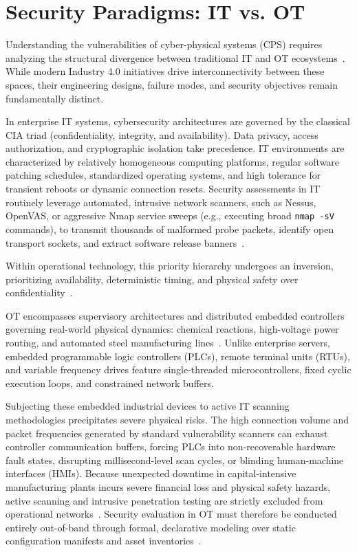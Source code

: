 \documentclass[target=mst,aauheader=aics,style=]{thud}
\begin{document}
\section{Security Paradigms: IT vs. OT}
\label{sec:it_vs_ot}

Understanding the vulnerabilities of cyber-physical systems (CPS) requires analyzing the structural divergence between traditional IT and OT ecosystems~\cite{SunderOT, StanExtended}. While modern Industry 4.0 initiatives drive interconnectivity between these spaces, their engineering designs, failure modes, and security objectives remain fundamentally distinct.

In enterprise IT systems, cybersecurity architectures are governed by the classical CIA triad (confidentiality, integrity, and availability). Data privacy, access authorization, and cryptographic isolation take precedence. IT environments are characterized by relatively homogeneous computing platforms, regular software patching schedules, standardized operating systems, and high tolerance for transient reboots or dynamic connection resets. Security assessments in IT routinely leverage automated, intrusive network scanners, such as Nessus, OpenVAS, or aggressive Nmap service sweeps (e.g., executing broad \texttt{nmap -sV} commands), to transmit thousands of malformed probe packets, identify open transport sockets, and extract software release banners~\cite{Ou05}.

Within operational technology, this priority hierarchy undergoes an inversion, prioritizing availability, deterministic timing, and physical safety over confidentiality~\cite{SunderOT}. 

OT encompasses supervisory architectures and distributed embedded controllers governing real-world physical dynamics: chemical reactions, high-voltage power routing, and automated steel manufacturing lines~\cite{StanExtended}. Unlike enterprise servers, embedded programmable logic controllers (PLCs), remote terminal units (RTUs), and variable frequency drives feature single-threaded microcontrollers, fixed cyclic execution loops, and constrained network buffers.

Subjecting these embedded industrial devices to active IT scanning methodologies precipitates severe physical risks. The high connection volume and packet frequencies generated by standard vulnerability scanners can exhaust controller communication buffers, forcing PLCs into non-recoverable hardware fault states, disrupting millisecond-level scan cycles, or blinding human-machine interfaces (HMIs). Because unexpected downtime in capital-intensive manufacturing plants incurs severe financial loss and physical safety hazards, active scanning and intrusive penetration testing are strictly excluded from operational networks~\cite{TayouriSurvey}. Security evaluation in OT must therefore be conducted entirely out-of-band through formal, declarative modeling over static configuration manifests and asset inventories~\cite{Ou05, TayouriMIRAGE, alviano2025llmasp}.
\end{document}
